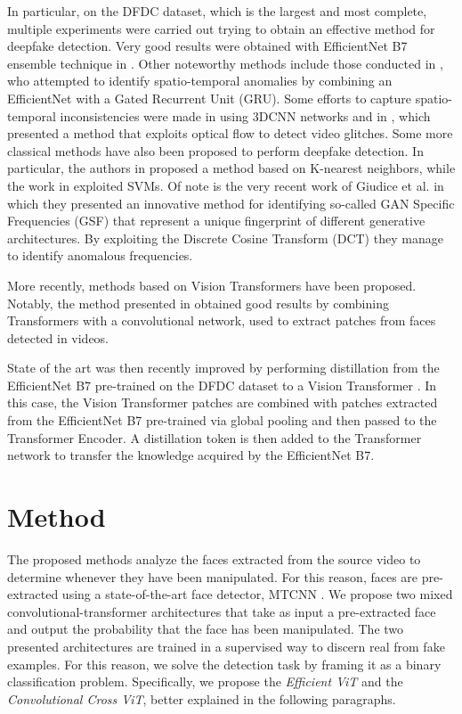 \documentclass[runningheads]{llncs}
\begin{document}
In particular, on the DFDC dataset, which is the largest and most complete, multiple experiments were carried out trying to obtain an effective method for deepfake detection. Very good results were obtained with EfficientNet B7 ensemble technique in 
\cite{dfdc_solution}. Other noteworthy methods include those conducted in \cite{montserrat2020deepfakes}, who attempted to identify spatio-temporal anomalies by combining an EfficientNet with a Gated Recurrent Unit (GRU). Some efforts to capture spatio-temporal inconsistencies were made in  \cite{delima2020deepfake} using 3DCNN networks and in \cite{amerini2019deepfake}, which presented a method that exploits optical flow to detect video glitches. Some more classical methods have also been proposed to perform deepfake detection. In particular, the authors in \cite{guarnera2020deepfake} proposed a method based on K-nearest neighbors, while the work in \cite{yang2019exposing} exploited SVMs. Of note is the very recent work of Giudice et al. \cite{jimaging7080128} in which they presented an innovative method for identifying so-called GAN Specific Frequencies (GSF) that represent a unique fingerprint of different generative architectures. By exploiting the Discrete Cosine Transform (DCT) they manage to identify anomalous frequencies.

More recently, methods based on Vision Transformers have been proposed. Notably, the method presented in \cite{wodajo2021deepfake} obtained good results by combining Transformers with a convolutional network, used to extract patches from faces detected in videos. 

State of the art was then recently improved by performing distillation from the EfficientNet B7 pre-trained on the DFDC dataset to a Vision Transformer \cite{heo2021deepfake}. In this case, the Vision Transformer patches are combined with patches extracted from the EfficientNet B7 pre-trained via global pooling and then passed to the Transformer Encoder. A distillation token is then added to the Transformer network to transfer the knowledge acquired by the EfficientNet B7. 

\section{Method}
The proposed methods analyze the faces extracted from the source video to determine whenever they have been manipulated. For this reason, faces are pre-extracted using a state-of-the-art face detector, MTCNN \cite{zhang2016joint}. We propose two mixed convolutional-transformer architectures that take as input a pre-extracted face and output the probability that the face has been manipulated. The two presented architectures are trained in a supervised way to discern real from fake examples. For this reason, we solve the detection task by framing it as a binary classification problem. Specifically, we propose the \textit{Efficient ViT} and the \textit{Convolutional Cross ViT}, better explained in the following paragraphs.
\end{document}

